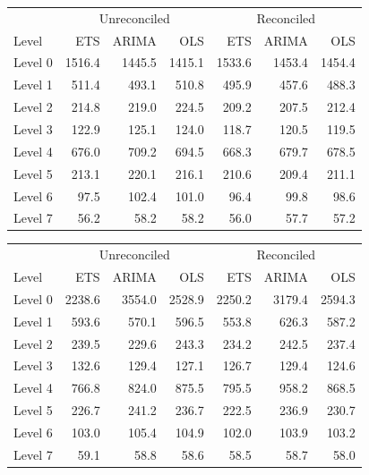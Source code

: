 \documentclass[11pt,a4paper,]{article}
\let\origtable\table
\let\endorigtable\endtable
\renewenvironment{table}[1][2] {
    \expandafter\origtable\expandafter[!htbp]
} {
    \endorigtable
}
\begin{document}
\begin{table}[!h]

\caption{\label{tab:Tourismdataresulrolling}Mean(RMSE) for ETS, ARIMA and OLS with and without reconciliation - Rolling origin 24-step-ahead - Tourism dataset}
\centering
\begin{tabular}{lrrrrrr}
\toprule
\multicolumn{1}{c}{} & \multicolumn{3}{c}{Unreconciled} & \multicolumn{3}{c}{Reconciled} \\
\cmidrule(l{2pt}r{2pt}){2-4} \cmidrule(l{2pt}r{2pt}){5-7}
Level & ETS & ARIMA & OLS & ETS & ARIMA & OLS\\
\midrule
Level 0 & 1516.4 & 1445.5 & 1415.1 & 1533.6 & 1453.4 & 1454.4\\
Level 1 & 511.4 & 493.1 & 510.8 & 495.9 & 457.6 & 488.3\\
Level 2 & 214.8 & 219.0 & 224.5 & 209.2 & 207.5 & 212.4\\
Level 3 & 122.9 & 125.1 & 124.0 & 118.7 & 120.5 & 119.5\\
Level 4 & 676.0 & 709.2 & 694.5 & 668.3 & 679.7 & 678.5\\
Level 5 & 213.1 & 220.1 & 216.1 & 210.6 & 209.4 & 211.1\\
Level 6 & 97.5 & 102.4 & 101.0 & 96.4 & 99.8 & 98.6\\
Level 7 & 56.2 & 58.2 & 58.2 & 56.0 & 57.7 & 57.2\\
\bottomrule
\end{tabular}
\end{table}

\begin{table}[t]

\caption{\label{tab:TourismdataresultRMSE}Mean(RMSE) for ETS, ARIMA and OLS with and without reconciliation - Fixed origin 24-step-ahead - Tourism dataset}
\centering
\begin{tabular}{lrrrrrr}
\toprule
\multicolumn{1}{c}{} & \multicolumn{3}{c}{Unreconciled} & \multicolumn{3}{c}{Reconciled} \\
\cmidrule(l{2pt}r{2pt}){2-4} \cmidrule(l{2pt}r{2pt}){5-7}
Level & ETS & ARIMA & OLS & ETS & ARIMA & OLS\\
\midrule
Level 0 & 2238.6 & 3554.0 & 2528.9 & 2250.2 & 3179.4 & 2594.3\\
Level 1 & 593.6 & 570.1 & 596.5 & 553.8 & 626.3 & 587.2\\
Level 2 & 239.5 & 229.6 & 243.3 & 234.2 & 242.5 & 237.4\\
Level 3 & 132.6 & 129.4 & 127.1 & 126.7 & 129.4 & 124.6\\
Level 4 & 766.8 & 824.0 & 875.5 & 795.5 & 958.2 & 868.5\\
Level 5 & 226.7 & 241.2 & 236.7 & 222.5 & 236.9 & 230.7\\
Level 6 & 103.0 & 105.4 & 104.9 & 102.0 & 103.9 & 103.2\\
Level 7 & 59.1 & 58.8 & 58.6 & 58.5 & 58.7 & 58.0\\
\bottomrule
\end{tabular}
\end{table}
\end{document}
